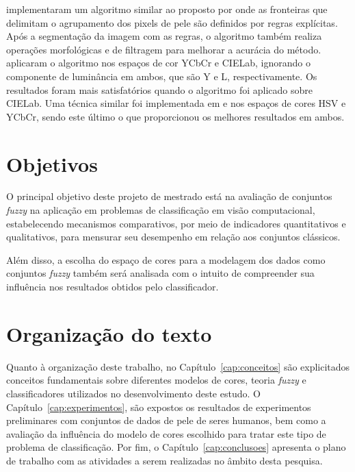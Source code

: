 \citet{kaur:12} implementaram um algoritmo similar ao proposto por \citet{kovac:03} onde as fronteiras que delimitam o agrupamento dos pixels de pele são definidos por regras explícitas. Após a segmentação da imagem com as regras, o algoritmo também realiza operações morfológicas e de filtragem para melhorar a acurácia do método. \citet{kaur:12} aplicaram o algoritmo nos espaços de cor YCbCr e CIELab, ignorando o componente de luminância em ambos, que são Y e L, respectivamente. Os resultados foram mais satisfatórios quando o algoritmo foi aplicado sobre CIELab. Uma técnica similar foi implementada em \citet{shaik:15} e \citet{kumar:15} nos espaços de cores HSV e YCbCr, sendo este último o que proporcionou os melhores resultados em ambos.


\section{Objetivos}
\label{sec:objetivo}

O principal objetivo deste projeto de mestrado está na avaliação de conjuntos \emph{fuzzy} na aplicação em problemas de classificação em visão computacional, estabelecendo mecanismos comparativos, por meio de indicadores quantitativos e qualitativos, para mensurar seu desempenho em relação aos conjuntos clássicos.

Além disso, a escolha do espaço de cores para a modelagem dos dados como conjuntos \emph{fuzzy} também será analisada com o intuito de compreender sua influência nos resultados obtidos pelo classificador.


\section{Organização do texto}
\label{sec:organizacao_trabalho}

Quanto à organização deste trabalho, no Capítulo~\ref{cap:conceitos} são explicitados conceitos fundamentais sobre diferentes modelos de cores, teoria \emph{fuzzy} e classificadores utilizados no desenvolvimento deste estudo. O Capítulo~\ref{cap:experimentos}, são expostos os resultados de experimentos preliminares com conjuntos de dados de pele de seres humanos, bem como a avaliação da influência do modelo de cores escolhido para tratar este tipo de problema de classificação. Por fim, o Capítulo~\ref{cap:conclusoes} apresenta o plano de trabalho com as atividades a serem realizadas no âmbito desta pesquisa.
